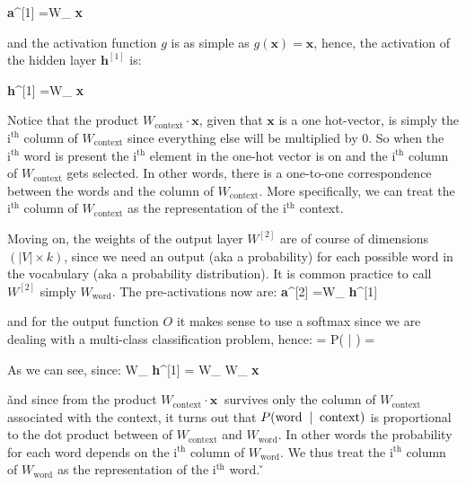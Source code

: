 \bse
\textbf{a}^{[1]} =W_{} \cdot \textbf{x}
\ese

and the activation function $g$ is as simple as $g(\textbf{x}) = \textbf{x}$, hence, the activation of the hidden
layer $\textbf{h}^{[1]}$ is:

\bse
\textbf{h}^{[1]} =W_{} \cdot \textbf{x}
\ese

Notice that the product $W_{\text{context}} \cdot \textbf{x}$, given that $\textbf{x}$ is a one hot-vector, is
simply the $\text{i}^{\text{th}}$ column of $W_{\text{context}}$ since everything else will be multiplied by 0.
So when the $\text{i}^{\text{th}}$ word is present the $\text{i}^{\text{th}}$ element in the one-hot vector
is on and the $\text{i}^{\text{th}}$ column of $W_{\text{context}}$ gets selected. In other words, there is a
one-to-one correspondence between the words and the column of $W_{\text{context}}$. More specifically, we can treat
the $\text{i}^{\text{th}}$ column of $W_{\text{context}}$ as the representation of the
$\text{i}^{\text{th}}$ context.

\be
\vspace{-15pt}
\ee

Moving on, the weights of the output layer $W^{[2]}$ are of course of dimensions $(|V| \times k)$, since we need an
output (aka a probability) for each possible word in the vocabulary (aka a probability distribution). It is common
practice to call $W^{[2]}$ simply $W_{\text{word}}$. The pre-activations now are:
\bse
\textbf{a}^{[2]} =W_{} \cdot \textbf{h}^{[1]}
\ese

and for the output function $O$ it makes sense to use a softmax since we are dealing with a multi-class
classification problem, hence:
\bse
{} = P( | ) = 
\ese

As we can see, since:
\bse
W_{} \cdot \textbf{h}^{[1]} = W_{} \cdot W_{} \cdot \textbf{x}
\ese

\v

and since from the product $W_{\text{context}} \cdot \textbf{x} \:$ survives only the column of
$W_{\text{context}}$ associated with the context, it turns out that $P (\text{word \:} | \text{\: context})$ is
proportional to the dot product between of $W_{\text{context}}$ and $W_{\text{word}}$. In other words the
probability for each word depends on the $\text{i}^{\text{th}}$ column of $W_{\text{word}}$. We thus treat the
$\text{i}^{\text{th}}$ column of $W_{\text{word}}$ as the representation of the $\text{i}^{\text{th}}$ word.
\v

